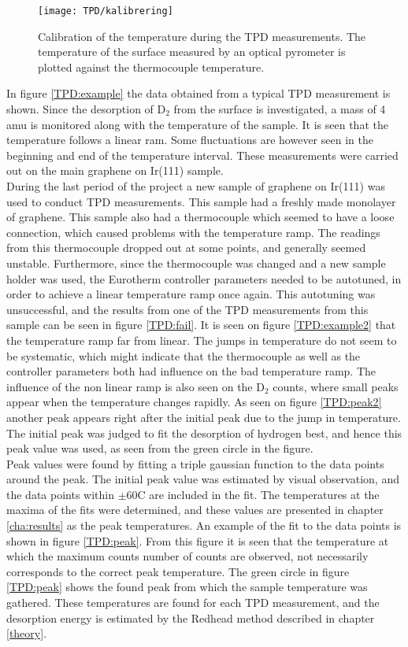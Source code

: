 \begin{figure}
  \centering
  \texttt{[image: TPD/kalibrering]}
  \caption{Calibration of the temperature during the TPD measurements. The temperature of the surface measured by an optical pyrometer is plotted against the thermocouple temperature.}
  \label{TPDcalibration}
\end{figure}
In figure \ref{TPD:example} the data obtained from a typical TPD measurement is shown. Since the desorption of D$_2$ from the surface is investigated, a mass of 4 amu is monitored along with the temperature of the sample. It is seen that the temperature follows a linear ram. Some fluctuations are however seen in the beginning and end of the temperature interval. These measurements were carried out on the main graphene on Ir(111) sample.\\
During the last period of the project a new sample of graphene on Ir(111) was used to conduct TPD measurements. This sample had a freshly made monolayer of graphene.  This sample also had a thermocouple which seemed to have a loose connection, which caused problems with the temperature ramp. The readings from this thermocouple dropped out at some points, and generally seemed unstable. Furthermore, since the thermocouple was changed and a new sample holder was used, the Eurotherm controller parameters needed to be autotuned, in order to achieve a linear temperature ramp once again. This autotuning was unsuccessful, and the results from one of the TPD measurements from this sample can be seen in figure \ref{TPD:fail}. It is seen on figure \ref{TPD:example2} that the temperature ramp far from linear. The jumps in temperature do not seem to be systematic, which might indicate that the thermocouple as well as the controller parameters both had influence on the bad temperature ramp. The influence of the non linear ramp is also seen on the D$_2$ counts, where small peaks appear when the temperature changes rapidly. As seen on figure \ref{TPD:peak2} another peak appears right after the initial peak due to the jump in temperature. The initial peak was judged to fit the desorption of hydrogen best, and hence this peak value was used, as seen from the green circle in the figure. \\
Peak values were found by fitting a triple gaussian function to the data points around the peak. The initial peak value was estimated by visual observation, and the data points within $\pm$60\degree C are included in the fit. The temperatures at the maxima of the fits were determined, and these values are presented in chapter \ref{cha:results} as the peak temperatures. An example of the fit to the data points is shown in figure \ref{TPD:peak}. From this figure it is seen that the temperature at which the maximum counts number of counts are observed, not necessarily corresponds to the correct peak temperature. The green circle in figure \ref{TPD:peak} shows the found peak from which the sample temperature was gathered. These temperatures are found for each TPD measurement, and the desorption energy is estimated by the Redhead method described in chapter \ref{theory}.\\
